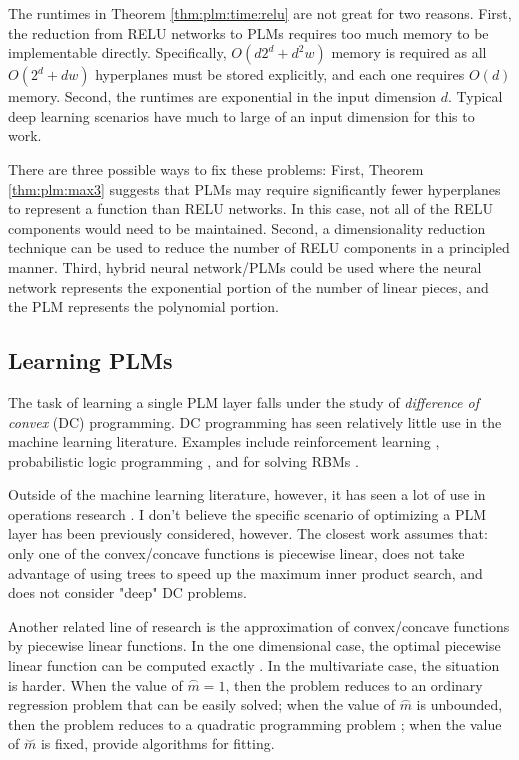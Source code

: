 \documentclass{article}
\newcommand{\defn}[1]{\textit{#1}}
\newcommand{\mconvex}{{\stackrel\smile m}}
\newcommand{\mconcave}{{\stackrel\frown m}}
\begin{document}
The runtimes in Theorem \ref{thm:plm:time:relu} are not great for two reasons.
First, the reduction from RELU networks to PLMs requires too much memory to be implementable directly.
Specifically, $O(d2^d+d^2w)$ memory is required as all $O(2^d+dw)$ hyperplanes must be stored explicitly, 
and each one requires $O(d)$ memory.
Second, the runtimes are exponential in the input dimension $d$.
Typical deep learning scenarios have much to large of an input dimension for this to work.

There are three possible ways to fix these problems:
First, Theorem \ref{thm:plm:max3} suggests that PLMs may require significantly fewer hyperplanes to represent a function than RELU networks.
In this case, not all of the RELU components would need to be maintained.
Second, a dimensionality reduction technique can be used to reduce the number of RELU components in a principled manner.
Third, hybrid neural network/PLMs could be used where the neural network represents the exponential portion of the number of linear pieces, 
and the PLM represents the polynomial portion.

\subsection{Learning PLMs}

The task of learning a single PLM layer falls under the study of \defn{difference of convex} (DC) programming.
DC programming has seen relatively little use in the machine learning literature.
Examples include reinforcement learning \citep{piot2014difference}, 
probabilistic logic programming \citep{bach2015hinge},
and for solving RBMs \citep{upadhya2017learning}. 

Outside of the machine learning literature, however, it has seen a lot of use in operations research \citep[e.g.][]{tao1997convex,tao2005dc,le2012exact,dinh2014recent,le2015dc,ciripoi2017vector}.
I don't believe the specific scenario of optimizing a PLM layer has been previously considered, however.
The closest work assumes that:
only one of the convex/concave functions is piecewise linear,
does not take advantage of using trees to speed up the maximum inner product search,
and does not consider "deep" DC problems.

Another related line of research is the approximation of convex/concave functions by piecewise linear functions. 
In the one dimensional case, the optimal piecewise linear function can be computed exactly \citep{gavrilovic1975optimal}.
In the multivariate case, the situation is harder.
When the value of $\mconcave=1$, 
then the problem reduces to an ordinary regression problem that can be easily solved;
when the value of $\mconcave$ is unbounded,
then the problem reduces to a quadratic programming problem \citep[][Section 6.5.5]{boyd2004convex};
when the value of $\mconvex$ is fixed,
\citet{magnani2009convex,hannah2013multivariate,balazs2015near,balazs2016max} provide algorithms for fitting.
\end{document}
